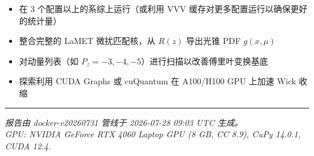 \documentclass[12pt,a4paper]{ctexart}
\begin{document}
\begin{itemize}[itemsep=2pt]
  \item 在 3 个配置以上的系综上运行（或利用 VVV 缓存对更多配置运行以确保更好的统计量）
  \item 整合完整的 LaMET 微扰匹配核，从 $R(z)$ 导出光锥 PDF $g(x,\mu)$
  \item 对动量列表（如 $P_z=-3,-4,-5$）进行扫描以改善傅里叶变换基底
  \item 探索利用 CUDA Graphs 或 cuQuantum 在 A100/H100 GPU 上加速 Wick 收缩
\end{itemize}

\vfill
\hrule
\vspace{4pt}
{\small \textit{报告由 docker-v20260731 管线于 2026-07-28 09:03 UTC 生成。} \\
\textit{GPU: NVIDIA GeForce RTX 4060 Laptop GPU (8 GB, CC 8.9), CuPy 14.0.1, CUDA 12.4.}}\par
\end{document}

